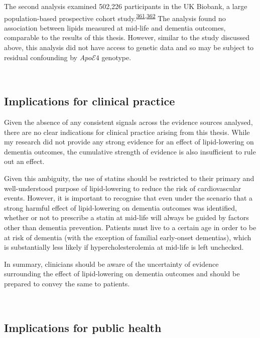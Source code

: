 \documentclass[a4paper, twoside]{templates/ociamthesis}
\begin{document}
The second analysis examined 502,226 participants in the UK Biobank, a large population-based prospective cohort study.\textsuperscript{\protect\hyperlink{ref-gong2021}{361},\protect\hyperlink{ref-sudlow2015}{362}} The analysis found no association between lipids measured at mid-life and dementia outcomes, comparable to the results of this thesis. However, similar to the study discussed above, this analysis did not have access to genetic data and so may be subject to residual confounding by \emph{Apo}\(\mathcal{E}4\) genotype.

~

\hypertarget{implications-for-clinical-practice}{%
\subsection{Implications for clinical practice}\label{implications-for-clinical-practice}}

Given the absence of any consistent signals across the evidence sources analysed, there are no clear indications for clinical practice arising from this thesis. While my research did not provide any strong evidence for an effect of lipid-lowering on dementia outcomes, the cumulative strength of evidence is also insufficient to rule out an effect.

Given this ambiguity, the use of statins should be restricted to their primary and well-understood purpose of lipid-lowering to reduce the risk of cardiovascular events. However, it is important to recognise that even under the scenario that a strong harmful effect of lipid-lowering on dementia outcomes was identified, whether or not to prescribe a statin at mid-life will always be guided by factors other than dementia prevention. Patients must live to a certain age in order to be at risk of dementia (with the exception of familial early-onset dementias), which is substantially less likely if hypercholesterolemia at mid-life is left unchecked.

In summary, clinicians should be aware of the uncertainty of evidence surrounding the effect of lipid-lowering on dementia outcomes and should be prepared to convey the same to patients.

~

\hypertarget{implications-for-public-health}{%
\subsection{Implications for public health}\label{implications-for-public-health}}
\end{document}
